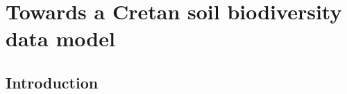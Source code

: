 % 
% 


\chapter{Towards a Cretan soil biodiversity data model}
\label{cha:crete-idea}



%
\section{Introduction}\label{intro_idea}

